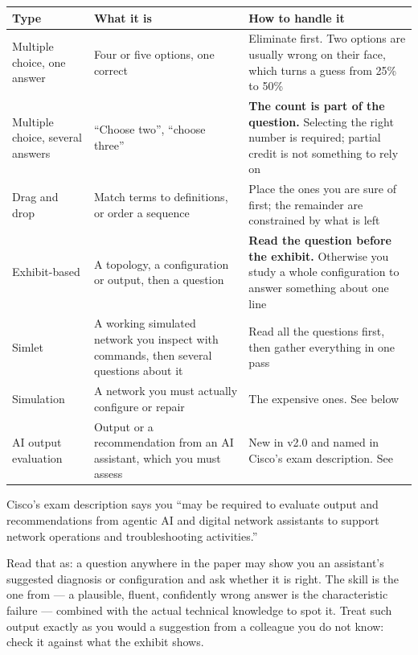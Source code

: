 \begin{longtable}{@{}L{3.3cm}L{5.3cm}L{6.4cm}@{}}
\toprule
{}
\textbf{Type} & \textbf{What it is} & \textbf{How to handle it} \\
\midrule
\endhead
Multiple choice, one answer &
Four or five options, one correct &
Eliminate first. Two options are usually wrong on their face, which turns a guess
from 25\% to 50\% \\
Multiple choice, several answers &
``Choose two'', ``choose three'' &
\textbf{The count is part of the question.} Selecting the right number is
required; partial credit is not something to rely on \\
Drag and drop &
Match terms to definitions, or order a sequence &
Place the ones you are sure of first; the remainder are constrained by what is
left \\
Exhibit-based &
A topology, a configuration or  output, then a question &
\textbf{Read the question before the exhibit.} Otherwise you study a whole
configuration to answer something about one line \\
Simlet &
A working simulated network you inspect with  commands, then several
questions about it &
Read all the questions first, then gather everything in one pass \\
Simulation &
A network you must actually configure or repair &
The expensive ones. See below \\
AI output evaluation &
Output or a recommendation from an AI assistant, which you must assess &
New in v2.0 and named in Cisco's exam description. See  \\
\bottomrule
\end{longtable}

\begin{examnote}
Cisco's exam description says you ``may be required to evaluate output and
recommendations from agentic AI and digital network assistants to support network
operations and troubleshooting activities.''

Read that as: a question anywhere in the paper may show you an assistant's
suggested diagnosis or configuration and ask whether it is right. The skill is
the one from  --- a plausible, fluent, confidently wrong answer is the
characteristic failure --- combined with the actual technical knowledge to spot
it. Treat such output exactly as you would a suggestion from a colleague you do
not know: check it against what the exhibit shows.
\end{examnote}

